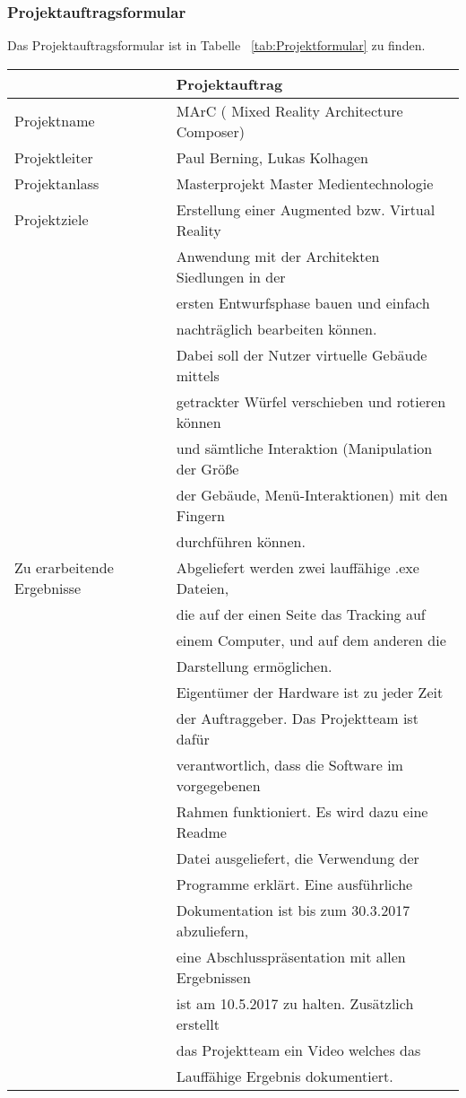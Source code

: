 \subsubsection{Projektauftragsformular}
Das Projektauftragsformular ist in Tabelle ~\ref{tab:Projektformular} zu finden.
\begin{table}
	\centering
	\begin{tabularx}{\textwidth}{|l|l|}
	\hline
	\Absatzbox{}
	& \textbf{Projektauftrag}\\	
	\hline
	Projektname & MArC ( Mixed Reality Architecture Composer)\\
	\hline
	Projektleiter & Paul Berning, Lukas Kolhagen\\
	\hline
	Projektanlass & Masterprojekt Master Medientechnologie\\
	\hline
	Projektziele & Erstellung einer Augmented bzw. Virtual Reality \\
	&Anwendung mit der Architekten Siedlungen in der\\ & ersten Entwurfsphase bauen und einfach \\ & nachträglich bearbeiten können.\\
	 &Dabei soll der Nutzer virtuelle Gebäude mittels \\
	& getrackter Würfel verschieben und rotieren können \\
	&und sämtliche Interaktion (Manipulation der Größe\\ 
	& der Gebäude, Menü-Interaktionen) mit den Fingern \\
	&durchführen können.\\
	\hline
	Zu erarbeitende Ergebnisse & Abgeliefert werden zwei lauffähige .exe Dateien,\\
	& die auf der einen Seite das Tracking auf \\
	&einem Computer, und auf dem anderen die \\
	&Darstellung ermöglichen. \\
	&Eigentümer der Hardware ist zu jeder Zeit\\
	&der Auftraggeber. Das Projektteam ist dafür\\
	&verantwortlich, dass die Software im vorgegebenen\\
	&Rahmen funktioniert. Es wird dazu eine Readme \\
	&Datei ausgeliefert, die Verwendung der\\
	& Programme erklärt. Eine ausführliche \\
	&Dokumentation ist bis zum 30.3.2017 abzuliefern,\\
	& eine Abschlusspräsentation mit allen Ergebnissen\\
	& ist am 10.5.2017 zu halten. Zusätzlich erstellt\\
	 &das Projektteam ein Video welches das\\
	& Lauffähige Ergebnis dokumentiert.\\
	

\end{tabularx}
\end{table}
